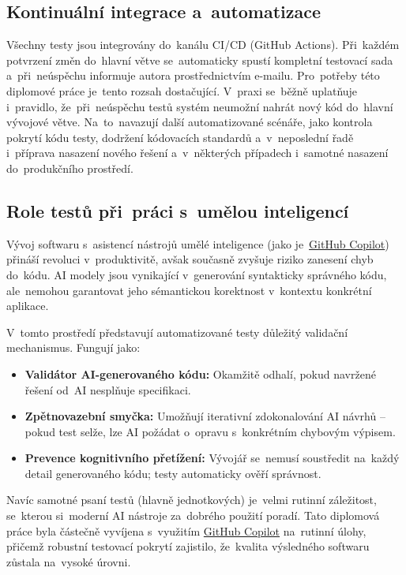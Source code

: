 \documentclass[
  master,
  program=ainfvs,
  printversion,
  figures=false,
  tables=false,
  glossaries,
  index
]{kidiplom}
\begin{document}
\subsection{Kontinuální integrace a~automatizace}
Všechny testy jsou integrovány do~kanálu CI/CD (GitHub Actions). Při~každém potvrzení změn do~hlavní větve se~automaticky spustí kompletní testovací sada a~při~neúspěchu informuje autora prostřednictvím e-mailu. Pro~potřeby této diplomové práce je~tento rozsah dostačující. V~praxi se~běžně uplatňuje i~pravidlo, že~při~neúspěchu testů systém neumožní nahrát nový kód do~hlavní vývojové větve. Na~to~navazují další automatizované scénáře, jako kontrola pokrytí kódu testy, dodržení kódovacích standardů a~v~neposlední řadě i~příprava nasazení nového řešení a~v~některých případech i~samotné nasazení do~produkčního prostředí.

\subsection{Role testů při~práci s~umělou inteligencí}
Vývoj softwaru s~asistencí nástrojů umělé inteligence (jako je~\hyperref[par:gc]{GitHub Copilot}) přináší revoluci v~produktivitě, avšak současně zvyšuje riziko zanesení chyb do~kódu. AI modely jsou vynikající v~generování syntakticky správného kódu, ale~nemohou garantovat jeho sémantickou korektnost v~kontextu konkrétní aplikace.

V~tomto prostředí představují automatizované testy důležitý validační mechanismus. Fungují jako:
\begin{itemize}
    \item \textbf{Validátor AI-generovaného kódu:} Okamžitě odhalí, pokud navržené řešení od~AI nesplňuje specifikaci.
    \item \textbf{Zpětnovazební smyčka:} Umožňují iterativní zdokonalování AI návrhů -- pokud test selže, lze AI požádat o~opravu s~konkrétním chybovým výpisem.
    \item \textbf{Prevence kognitivního přetížení:} Vývojář se~nemusí soustředit na~každý detail generovaného kódu; testy automaticky ověří správnost.
\end{itemize}

Navíc samotné psaní testů (hlavně jednotkových) je~velmi rutinní záležitost, se~kterou si~moderní AI nástroje za~dobrého použití poradí. Tato diplomová práce byla částečně vyvíjena s~využitím \hyperref[par:gc]{GitHub Copilot} na~rutinní úlohy, přičemž robustní testovací pokrytí zajistilo, že~kvalita výsledného softwaru zůstala na~vysoké úrovni. 
\end{document}
